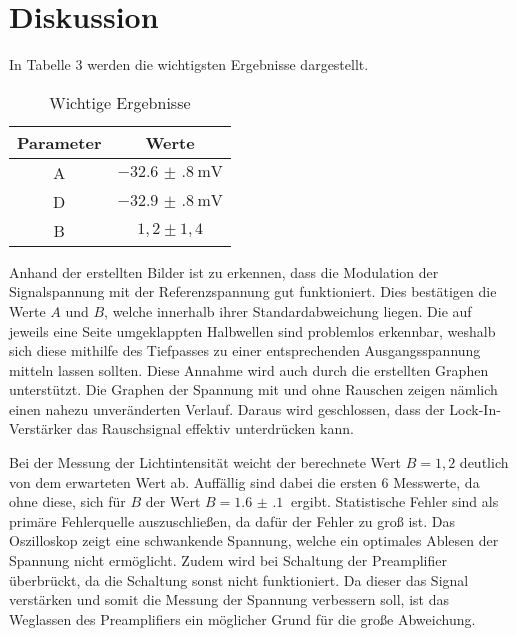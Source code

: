 \section{Diskussion}
\label{sec:Diskussion}

In Tabelle 3 werden die wichtigsten Ergebnisse dargestellt.
\begin{table}[H]
  \centering
  \caption{Wichtige Ergebnisse}
  \label{tab:Phase}
  \begin{tabular}{c c}
    \toprule
    Parameter & Werte \\
    \midrule
    A & $\SI{-32.6(8)}{\milli\volt}$ \\
    D & $\SI{-32.9(8)}{\milli\volt}$ \\
    B & $1,2 \pm 1,4$ \\
    \bottomrule
  \end{tabular}
\end{table}



Anhand der erstellten Bilder ist zu erkennen, dass die Modulation der Signalspannung mit der Referenzspannung gut funktioniert. Dies bestätigen
die Werte $A$ und $B$, welche innerhalb ihrer Standardabweichung liegen.
Die auf jeweils eine Seite umgeklappten Halbwellen sind problemlos erkennbar, weshalb sich diese mithilfe des
Tiefpasses zu einer entsprechenden Ausgangsspannung mitteln lassen sollten. Diese Annahme wird auch durch die erstellten
Graphen unterstützt.
Die Graphen der Spannung mit und ohne Rauschen zeigen nämlich einen nahezu unveränderten Verlauf. Daraus wird geschlossen, dass der
Lock-In-Verstärker das Rauschsignal effektiv unterdrücken kann.

Bei der Messung der Lichtintensität weicht der berechnete Wert $B=1,2$ deutlich von dem erwarteten Wert ab. Auffällig sind dabei
die ersten 6 Messwerte, da ohne diese, sich für $B$ der Wert $B= \SI{1.6(1)}{}$ ergibt. Statistische Fehler sind
als primäre Fehlerquelle auszuschließen, da dafür der Fehler zu groß ist. Das Oszilloskop zeigt eine schwankende Spannung, welche
ein optimales Ablesen der Spannung nicht ermöglicht. Zudem wird bei Schaltung der Preamplifier überbrückt, da die Schaltung sonst nicht
funktioniert. Da dieser das Signal verstärken und somit die Messung der Spannung verbessern soll, ist das Weglassen des
Preamplifiers ein möglicher Grund für die große Abweichung.
